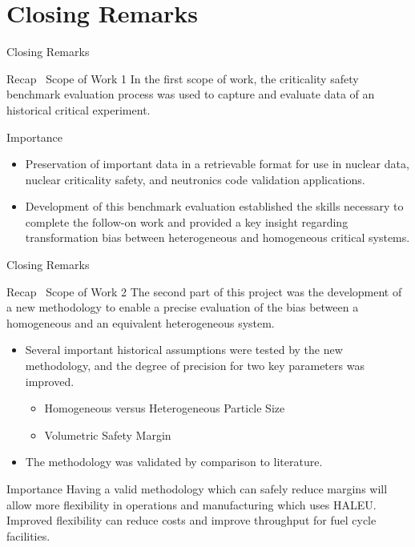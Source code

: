 \documentclass[10pt,aspectratio=169]{beamer}              %
\begin{document}
\section{Closing Remarks}

\begin{frame}{Closing Remarks}
    \begin{block}{Recap \textendash\ Scope of Work 1}
        In the first scope of work, the criticality safety benchmark evaluation process was used to capture and evaluate data of an historical critical experiment.
    \end{block}
    \begin{alertblock}{Importance}
        \begin{itemize}
            \item Preservation of important data in a retrievable format for use in nuclear data, nuclear criticality safety, and neutronics code validation applications.
            \item Development of this benchmark evaluation established the skills necessary to complete the follow-on work and provided a key insight regarding transformation bias between heterogeneous and homogeneous critical systems.
        \end{itemize}
    \end{alertblock}
\end{frame}

\begin{frame}{Closing Remarks}
    \begin{block}{Recap \textendash\ Scope of Work 2}
        The second part of this project was the development of a new methodology to enable a precise evaluation of the bias between a homogeneous and an equivalent heterogeneous system.
    \end{block}
    \begin{itemize}
        \item Several important historical assumptions were tested by the new methodology, and the degree of precision for two key parameters was improved.
        \begin{itemize}
            \item Homogeneous versus Heterogeneous Particle Size
            \item Volumetric Safety Margin
        \end{itemize}
        \item The methodology was validated by comparison to literature.
    \end{itemize}
    \begin{alertblock}{Importance}
        Having a valid methodology which can safely reduce margins will allow more flexibility in operations and manufacturing which uses HALEU. Improved flexibility can reduce costs and improve throughput for fuel cycle facilities.
    \end{alertblock}
\end{frame}
\end{document}
